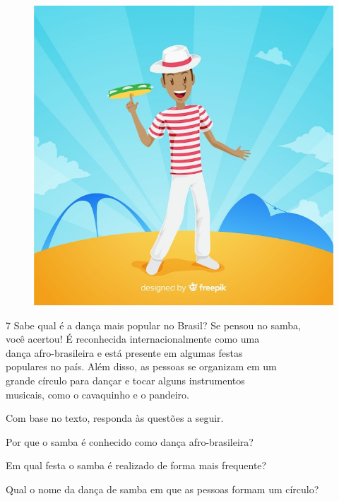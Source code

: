 
\begingroup
\begin{figure}
\includegraphics[width=.25\textwidth]{./imgs/img13.jpg}
\end{figure}

\num{7} Sabe qual é a dança mais popular no Brasil? Se pensou no samba,\\ você
  acertou! É reconhecida internacionalmente como uma\\ dança
  afro-brasileira e está presente em algumas festas\\ populares no país.
  Além disso, as pessoas se organizam em um\\ grande círculo para dançar e
  tocar alguns instrumentos\\ musicais, como o cavaquinho e o pandeiro.


\noindent{}Com base no texto, responda às questões a seguir.

\endgroup

\begin{escolha}
\item Por que o samba é conhecido como dança afro-brasileira?


\item Em qual festa o samba é realizado de forma mais frequente?


\item Qual o nome da dança de samba em que as pessoas formam um círculo?

\end{escolha}


